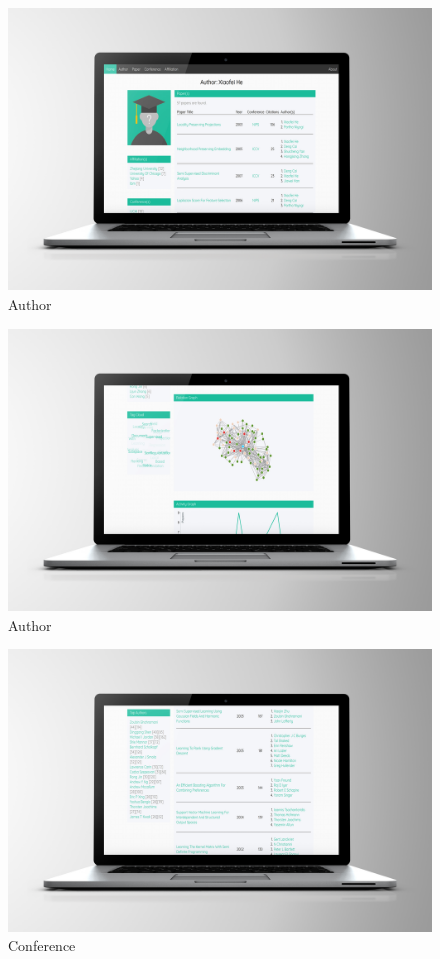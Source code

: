 \documentclass[a4paper]{article}
\begin{document}
                        \begin{figure}[H]
            \centering
            \includegraphics[width=.8\textwidth]{img/img2.jpg}
            \caption{Author}
            \end{figure}
                        \begin{figure}[H]
            \centering
            \includegraphics[width=.8\textwidth]{img/img3.jpg}
            \caption{Author}
            \end{figure}
                        \begin{figure}[H]
            \centering
            \includegraphics[width=.8\textwidth]{img/img4.jpg}
            \caption{Conference}
            \end{figure}
\end{document}
